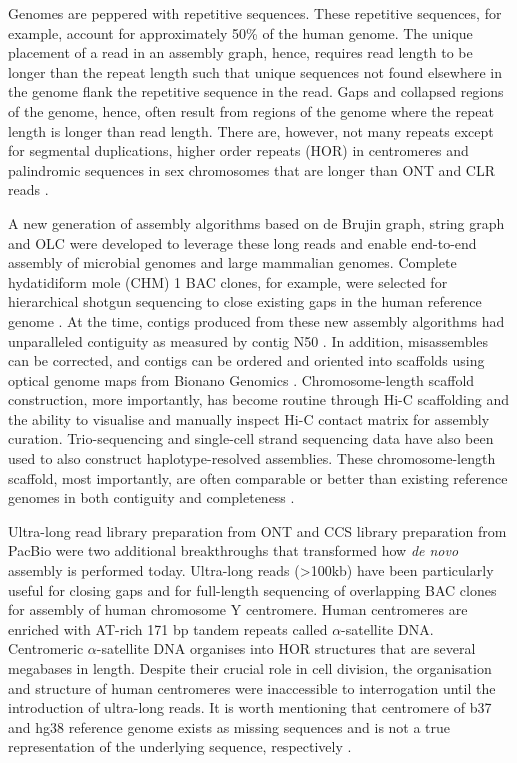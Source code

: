 Genomes are peppered with repetitive sequences. These repetitive sequences, for example, account for approximately 50\% of the human genome\cite{Lander2001-du}. The unique placement of a read in an assembly graph, hence, requires read length to be longer than the repeat length such that unique sequences not found elsewhere in the genome flank the repetitive sequence in the read. Gaps and collapsed regions of the genome, hence, often result from regions of the genome where the repeat length is longer than read length. There are, however, not many repeats except for segmental duplications\cite{Bailey2002-xn}, higher order repeats (HOR) in centromeres\cite{Willard1985-bo} and palindromic sequences in sex chromosomes that are longer than ONT and CLR reads \cite{Skaletsky2003-sr}. 

A new generation of assembly algorithms based on de Brujin graph\cite{Lin2016-vl}, string graph\cite{Myers2005-ei, Chin2016-at} and OLC\cite{Koren2017-cq} were developed to leverage these long reads and enable end-to-end assembly of microbial genomes\cite{Bashir2012-cs, Chin2013-hp} and large mammalian genomes\cite{Chin2016-at, Koren2017-cq}. Complete hydatidiform mole (CHM) 1 BAC clones, for example, were selected for hierarchical shotgun sequencing to close existing gaps in the human reference genome \cite{Huddleston2014-rs}. At the time, contigs produced from these new assembly algorithms had unparalleled contiguity as measured by contig N50 \cite{}. In addition, misassembles can be corrected, and contigs can be ordered and oriented into scaffolds using optical genome maps from Bionano Genomics \cite{Pendleton2015-ue}. Chromosome-length scaffold construction, more importantly, has become routine through Hi-C scaffolding\cite{Dudchenko2017-kb} and the ability to visualise\cite{Robinson2018-os} and manually inspect Hi-C contact matrix for assembly curation\cite{Dudchenko2018-yl}. Trio-sequencing\cite{Koren2018-wg} and single-cell strand sequencing data\cite{Porubsky2021-ct} have also been used to also construct haplotype-resolved assemblies. These chromosome-length scaffold, most importantly, are often comparable or better than existing reference genomes in both contiguity and completeness \cite{Matthews2018-tv}. 

Ultra-long read library preparation from ONT and CCS library preparation from PacBio were two additional breakthroughs that transformed how \textit{de novo} assembly is performed today. Ultra-long reads (>100kb) have been particularly useful for closing gaps\cite{Jain2018-zh} and for full-length sequencing of overlapping BAC clones for assembly of human chromosome Y centromere\cite{Jain2018-mg}. Human centromeres are enriched with AT-rich 171 bp tandem repeats called $\alpha$-satellite DNA. Centromeric $\alpha$-satellite DNA organises into HOR structures that are several megabases in length. Despite their crucial role in cell division, the organisation and structure of human centromeres were inaccessible to interrogation until the introduction of ultra-long reads. It is worth mentioning that centromere of b37 and hg38 reference genome exists as missing sequences and is not a true representation of the underlying sequence, respectively \cite{Miga2014-uv}.

